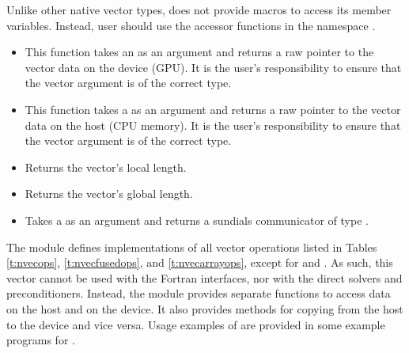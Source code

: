 Unlike other native {\sundials} vector types, {\nveccuda} does not provide macros
to access its member variables. Instead, user should use the accessor functions in
the namespace .
\begin{itemize}

\item

  This function takes an  as an argument and returns a raw pointer to the vector
  data on the device (GPU). It is the user's responsibility to ensure that the vector argument 
  is of the correct  type.

\item

  This function takes a  as an argument and returns a raw pointer to the vector
  data on the host (CPU memory). It is the user's responsibility to ensure that the vector argument 
  is of the correct  type.

\item {}

  Returns the vector's local length.


\item {}

  Returns the vector's global length.


\item {}

  Takes a  as an argument and returns a sundials communicator of type
  .

\end{itemize}


The {\nveccuda} module defines implementations of all vector operations listed 
in Tables \ref{t:nvecops}, \ref{t:nvecfusedops}, and \ref{t:nvecarrayops}, except
for  and .
As such, this vector cannot be used with the {\sundials} Fortran interfaces,
nor with the {\sundials} direct solvers and preconditioners. Instead,
the {\nveccuda} module provides separate functions to access data on the host
and on the device. It also provides methods for copying from the host to
the device and vice versa. Usage examples of {\nveccuda} are provided in
some example programs for {\cvode} \cite{cvode_ex}.

